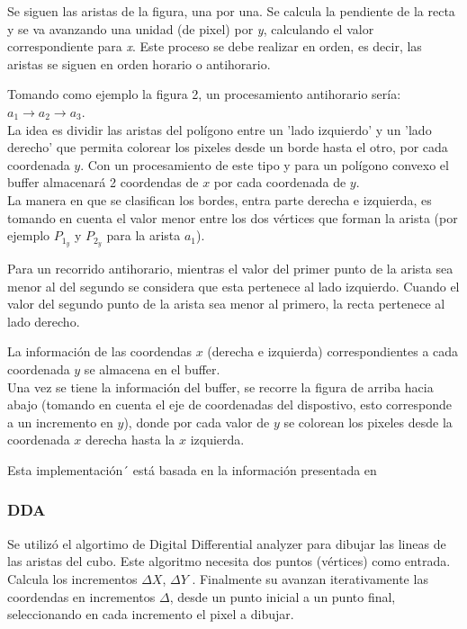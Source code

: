 \documentclass[12pt]{article}
\begin{document}
Se siguen las aristas de la figura, una por una. Se calcula la pendiente de la recta y se va avanzando una unidad (de pixel) por \textit{y}, calculando el valor correspondiente para \textit{x}. Este proceso se debe realizar en orden, es decir, las aristas se siguen en orden horario o antihorario. 

Tomando como ejemplo la figura 2, un procesamiento antihorario sería: $a_{1} \rightarrow a_{2} \rightarrow a_{3}$.\\

La idea es dividir las aristas del polígono entre un 'lado izquierdo' y un 'lado derecho' que permita colorear los pixeles desde un borde hasta el otro, por cada coordenada $y$. 
Con un procesamiento de este tipo y para un polígono convexo el buffer almacenará 2 coordendas de $x$ por cada coordenada de $y$.\\

La manera en que se clasifican los bordes, entra parte derecha e izquierda, es tomando en cuenta el valor menor entre los dos vértices que forman la arista (por ejemplo $P_{1_{y}}$ y $P_{2_{y}}$ para la arista $a_{1}$).

Para un recorrido antihorario, mientras el valor del primer punto de la arista sea menor al del segundo se considera que esta pertenece al lado izquierdo. Cuando el valor del segundo punto de la arista sea menor al primero, la recta pertenece al lado derecho. 

La información de las coordendas $x$ (derecha e izquierda) correspondientes a cada coordenada $y$ se almacena en el buffer.\\

Una vez se tiene la información del buffer, se recorre la figura de arriba hacia abajo (tomando en cuenta el eje de coordenadas del dispostivo, esto corresponde a un incremento en  $y$), donde por cada valor de $y$ se colorean los pixeles desde la coordenada $x$ derecha hasta la $x$ izquierda.

Esta implementación´ está basada en la información presentada en \cite{bb}

\subsubsection{DDA}
Se utilizó el algortimo de Digital Differential analyzer para dibujar las lineas de las aristas del cubo. Este algoritmo necesita dos puntos (vértices) como entrada. Calcula los incrementos $\Delta X$, $\Delta Y$ . Finalmente su avanzan iterativamente las coordendas en incrementos $\Delta$, desde un punto inicial a un punto final, seleccionando en cada incremento el pixel a dibujar. 
\end{document}

